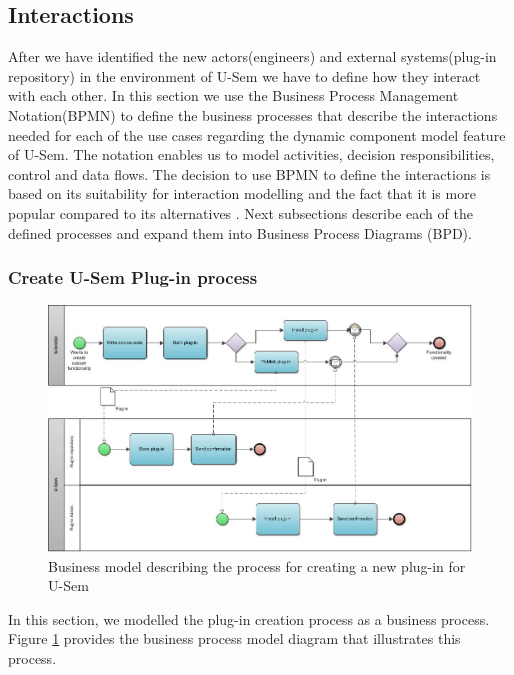 \subsection{Interactions}

After we have identified the new actors(engineers) and external systems(plug-in repository) in the environment of U-Sem we have to define how they interact with each other. In this section we use the Business Process Management Notation(BPMN) \cite{wohed2006suitability} to define the business processes that describe the interactions needed for each of the use cases regarding the dynamic component model feature of U-Sem. The notation enables us to model activities, decision responsibilities, control and data flows. The decision to use BPMN to define the interactions is based on its suitability for interaction modelling and the fact that it is more popular compared to its alternatives \cite{decker2008interaction}. Next subsections describe each of the defined processes and expand them into Business Process Diagrams (BPD).

\subsubsection{Create U-Sem Plug-in process}

\begin{figure}[h!]
  \centering
  	\includegraphics[scale=0.7,angle=270]{plug-in/business_processes/CreatePlugInBusinessModel.jpg}
  \caption{Business model describing the process for creating a new plug-in for U-Sem}
  \label{fig_install_bpm}
\end{figure}

In this section, we modelled the plug-in creation process as a business process. Figure \ref{fig_install_bpm} provides the business process model diagram that illustrates this process. 

